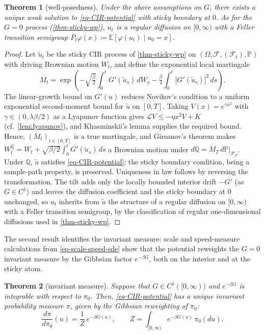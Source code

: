 \documentclass[aap,preprint]{imsart}
\numberwithin{equation}{section}
\theoremstyle{plain}
\newtheorem{theorem}{Theorem}[section]
\theoremstyle{definition}
\begin{document}
\begin{theorem}[well-posedness]\label{thm-exist-potential}
Under the above assumptions on $G$, there exists a unique weak solution to \cref{eq-CIR-potential} with sticky boundary at $0$.  As for the $G=0$ process (\cref{thm-sticky-wp}), $u_t$ is a regular diffusion on $[0,\infty)$ with a Feller transition semigroup $P_t\varphi(x)\coloneqq\mathbb{E}[\varphi(u_t)\mid u_0=x]$.
\end{theorem}

\begin{proof}
Let $\tilde u_t$ be the sticky CIR process of \cref{thm-sticky-wp} on $(\Omega,\mathcal{F},(\mathcal{F}_t),\mathbb{P})$ with driving Brownian motion $W_t$, and define the exponential local martingale
\[
  M_t = \exp\!\left(-\sqrt{\tfrac{\beta}{2}} \int_0^t G'(\tilde u_s)\,dW_s - \tfrac{\beta}{4}\int_0^t |G'(\tilde u_s)|^2\,ds\right).
\]
The linear-growth bound on $G'(u)$ reduces Novikov's condition to a uniform exponential second-moment bound for $\tilde u$ on $[0,T]$. Taking $V(x)=e^{\gamma x^2}$ with $\gamma\in(0,\lambda\beta/2)$ as a Lyapunov function gives $\mathcal{L}V \le -\eta x^2 V + K$ (cf.~\cref{lem:lyapunov}), and Khasminskii's lemma \citep[Lemma~1.2]{MeynTweedie1993} supplies the required bound. Hence, $(M_t)_{t\in[0,T]}$ is a true martingale, and Girsanov's theorem makes $W_t^{\mathbb{Q}} = W_t + \sqrt{\beta/2}\int_0^t G'(\tilde u_s)\,ds$ a Brownian motion under $d\mathbb{Q} = M_T\,d\mathbb{P}|_{\mathcal{F}_T}$. Under $\mathbb{Q}$, $\tilde u$ satisfies \cref{eq-CIR-potential}; the sticky boundary condition, being a sample-path property, is preserved. Uniqueness in law follows by reversing the transformation.  The tilt adds only the locally bounded interior drift $-G'$ (as $G\in C^1$) and leaves the diffusion coefficient and the sticky boundary at $0$ unchanged, so $u_t$ inherits from $\tilde u$ the structure of a regular diffusion on $[0,\infty)$ with a Feller transition semigroup, by the classification of regular one-dimensional diffusions used in \cref{thm-sticky-wp}.
\end{proof}

The second result identifies the invariant measure: scale and speed-measure calculations from \cref{eq-scale-speed-sde} show that the potential reweights the $G=0$ invariant measure by the Gibbsian factor $e^{-\beta G}$, both on the interior and at the sticky atom.

\begin{theorem}[invariant measure]\label{thm-inv-potential}
  Suppose that $G \in C^1([0,\infty))$ and $e^{-\beta G}$ is integrable
  with respect to $\pi_0$. Then, \cref{eq-CIR-potential}
  has a unique invariant probability measure $\pi$, given by the Gibbsian
  reweighting of $\pi_0$:
  \[
    \frac{d\pi}{d\pi_0}(u) = \frac{1}{Z}\,e^{-\beta G(u)},
    \qquad
    Z = \int_{[0,\infty)} e^{-\beta G(u)}\,\pi_0(du).
  \]
\end{theorem}
\end{document}
